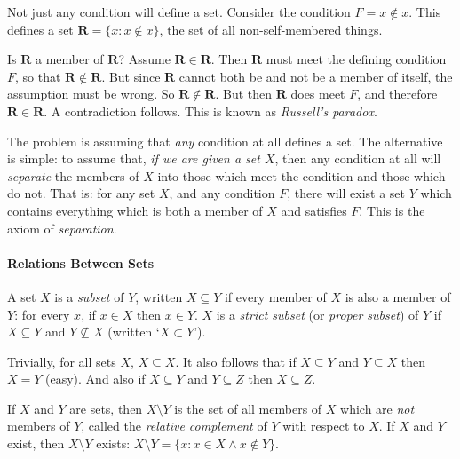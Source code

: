  Not just any condition will define a set. Consider the condition $F = x \notin x$. This defines a set $\mathbf{R} = \{x: x\notin x\}$, the set of all non-self-membered things.

 Is $\mathbf{R}$ a member of $\mathbf{R}$? Assume $\mathbf{R} \in \mathbf{R}$. Then $\mathbf{R}$ must meet the defining condition $F$, so that $\mathbf{R} \notin \mathbf{R}$. But since $\mathbf{R}$ cannot both be and not be a member of itself, the assumption must be wrong. So $\mathbf{R}\notin \mathbf{R}$. But then $\mathbf{R}$ does meet $F$, and therefore $\mathbf{R} \in \mathbf{R}$. A contradiction follows. This is known as \emph{Russell's paradox}.

The problem is assuming that \emph{any} condition at all defines a set. The alternative is simple: to assume that, \emph{if we are given a set $X$}, then any condition at all will \emph{separate} the members of $X$ into those which meet the condition and those which do not. That is: for any set $X$, and any condition $F$, there will exist a set $Y$ which contains everything which is both a member of $X$ and satisfies $F$. This is the axiom of \emph{separation}.


\paragraph{Relations Between Sets}

\begin{definition}[Subset] A set $X$ is a {\em subset} of $Y$, written
   $X \subseteq Y$ if every
    member of $X$ is also a member of $Y$: for every $x$, if $x \in X$
    then $x \in Y$. $X$ is a {\em strict subset} (or {\em proper
    subset}) of $Y$ if $X
    \subseteq Y$ and $Y \not\subseteq X$ (written `$X \subset
Y$').\end{definition}

Trivially, for all sets $X$, $X\subseteq X$. It also follows that if $X \subseteq Y$ and $Y \subseteq X$ then $X=Y$ (easy). And also if $X \subseteq Y$ and $Y \subseteq Z$ then $X \subseteq Z$.

\begin{definition} If $X$ and $Y$
	are sets, then $X \setminus Y$ is the set of all members of $X$ which
	are {\em not} members of $Y$, called the {\em relative complement} of
	$Y$ with respect to $X$. If $X$ and $Y$ exist, then $X\setminus Y$ exists: $X \setminus Y = \{x: x\in X \wedge x \notin Y\}$.\end{definition}


